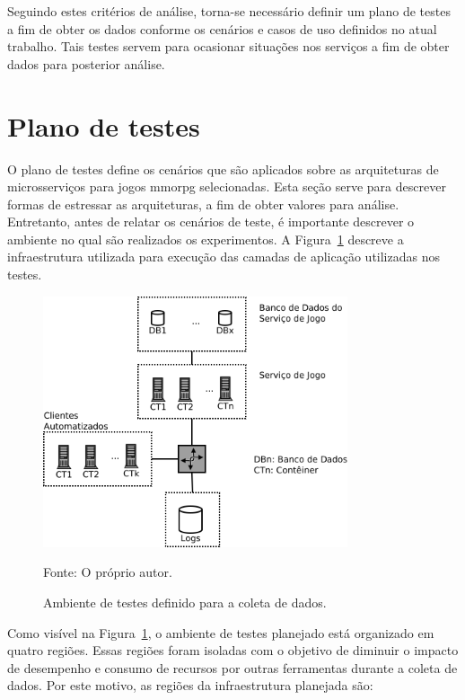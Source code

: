 Seguindo estes critérios de análise, torna-se necessário definir um plano de testes a fim de obter os dados conforme os cenários e casos de uso definidos no atual trabalho.
%
Tais testes servem para ocasionar situações nos serviços a fim de obter dados para posterior análise.



\section {Plano de testes}
\label{sec:plano}



O plano de testes define os cenários que são aplicados sobre as arquiteturas de microsserviços para jogos \ac{mmorpg} selecionadas.
%
Esta seção serve para descrever formas de estressar as arquiteturas, a fim de obter valores para análise.
%
Entretanto, antes de relatar os cenários de teste, é importante descrever o ambiente no qual são realizados os experimentos.
%
A Figura~\ref{Ambiente de testes} descreve a infraestrutura utilizada para execução das camadas de aplicação utilizadas nos testes.



\begin{figure}[htb!]
  \caption{Ambiente de testes definido para a coleta de dados.}
  \label{Ambiente de testes}
  \includegraphics[width=0.8\textwidth]{img/cap3/infraestrutura.png}
  \centering

  Fonte: O próprio autor.
\end{figure}



Como visível na Figura~\ref{Ambiente de testes}, o ambiente de testes planejado está organizado em quatro regiões.
%
Essas regiões foram isoladas com o objetivo de diminuir o impacto de desempenho e consumo de recursos por outras ferramentas durante a coleta de dados.
%
Por este motivo, as regiões da infraestrutura planejada são:



